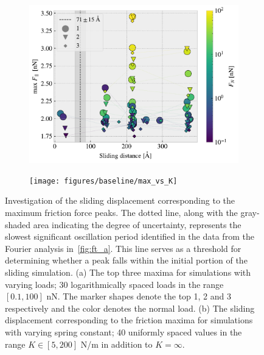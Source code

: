 \begin{figure}[!htb]
  \centering
  \begin{subfigure}[t]{0.49\textwidth}
      \centering
      \includegraphics[width=\textwidth]{figures/baseline/max_dist.pdf}
      \caption{}
        \label{fig:max_dist}
    \end{subfigure}
    \hfill
    \begin{subfigure}[t]{0.49\textwidth}
      \centering
      \texttt{[image: figures/baseline/max\_vs\_K]}
      \caption{}
      \label{fig:max_vs_K}
    \end{subfigure}
    \caption{Investigation of the sliding displacement corresponding to the maximum friction force peaks. The dotted line, along with the gray-shaded area indicating the degree of uncertainty, represents the slowest significant oscillation period identified in the data from the Fourier analysis in~\cref{fig:ft_a}. This line serves as a threshold for determining whether a peak falls within the initial portion of the sliding simulation. (a) The top three maxima for simulations with varying loads; 30 logarithmically spaced loads in the range $[0.1, 100]$ nN. The marker shapes denote the top 1, 2 and 3 respectively and the color denotes the normal load. (b) The sliding displacement corresponding to the friction maxima for simulations with varying spring constant; 40 uniformly spaced values in the range $K \in [5, 200]$ N/m in addition to $K = \infty$.}
    \label{fig:max_peaks}
\end{figure}



